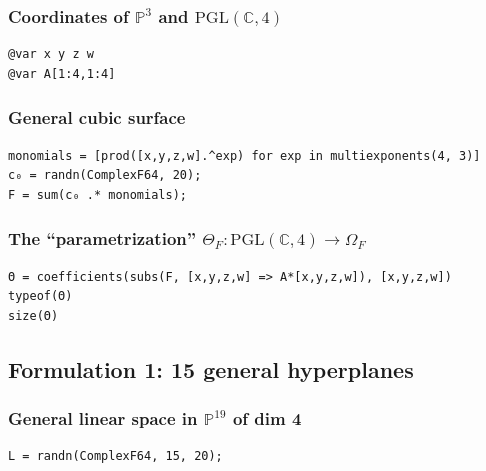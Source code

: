 \documentclass[11pt]{article}
\begin{document}
\subsubsection{Coordinates of \(\mathbb{P}^3\) and \(\mathrm{PGL}(\mathbb{C},4)\)}
\label{sec:org904b856}

\begin{verbatim}
@var x y z w
@var A[1:4,1:4]
\end{verbatim}

\subsubsection{General cubic surface}
\label{sec:org8ad6385}

\begin{verbatim}
monomials = [prod([x,y,z,w].^exp) for exp in multiexponents(4, 3)]
c₀ = randn(ComplexF64, 20);
F = sum(c₀ .* monomials);
\end{verbatim}

\subsubsection{The ``parametrization'' \(\Theta_F: \mathrm{PGL}(\mathbb{C},4) \to \Omega_F\)}
\label{sec:orga2a635f}

\begin{verbatim}
Θ = coefficients(subs(F, [x,y,z,w] => A*[x,y,z,w]), [x,y,z,w])
typeof(Θ)
size(Θ)
\end{verbatim}

\subsection{Formulation 1: 15 general hyperplanes}
\label{sec:org75d8832}
\subsubsection{General linear space in \(\mathbb{P}^{19}\) of dim 4}
\label{sec:orgdfd9997}

\begin{verbatim}
L = randn(ComplexF64, 15, 20);
\end{verbatim}
\end{document}
